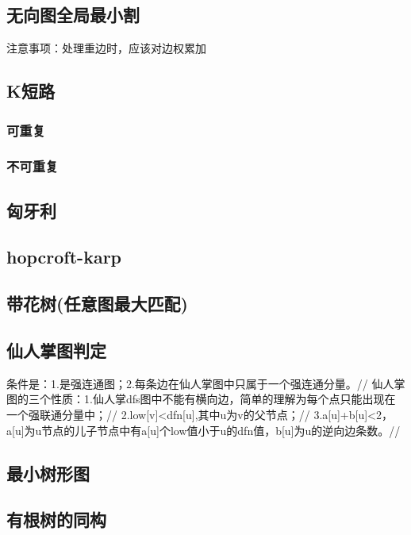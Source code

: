 \documentclass[landscape,a4paper]{article}
\begin{document}
\begin{spacing}{0.3}
\begin{multicols}{3}
	\subsection{无向图全局最小割}
	注意事项：处理重边时，应该对边权累加
	

		
		\subsection{K短路}
	\subsubsection{可重复}
	
	\subsubsection{不可重复}
	
	\subsection{匈牙利}
	
	\subsection{hopcroft-karp}
	
	\subsection{带花树(任意图最大匹配)}
	
	\subsection{仙人掌图判定}
	条件是：1.是强连通图；2.每条边在仙人掌图中只属于一个强连通分量。//
	仙人掌图的三个性质：1.仙人掌dfs图中不能有横向边，简单的理解为每个点只能出现在一个强联通分量中；//
	2.low[v]<dfn[u],其中u为v的父节点；//
	3.a[u]+b[u]<2，a[u]为u节点的儿子节点中有a[u]个low值小于u的dfn值，b[u]为u的逆向边条数。//
	

\subsection{最小树形图}
	
	\subsection{有根树的同构}
	

\end{multicols}
\end{spacing}
\end{document}
